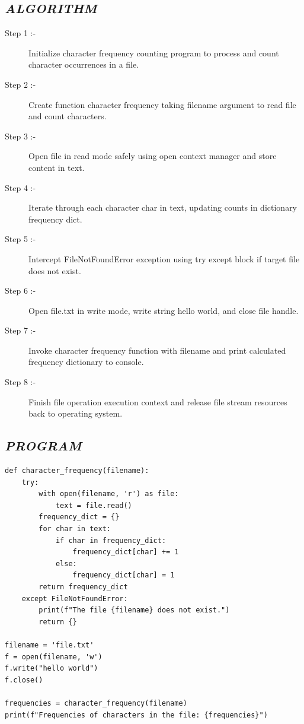 \documentclass[11pt,a4paper]{article}
\begin{document}
\subsection*{\textit{ALGORITHM}}
\begin{description}
  \item[Step 1 :-] Initialize character frequency counting program to process and count character occurrences in a file.
  \item[Step 2 :-] Create function character frequency taking filename argument to read file and count characters.
  \item[Step 3 :-] Open file in read mode safely using open context manager and store content in text.
  \item[Step 4 :-] Iterate through each character char in text, updating counts in dictionary frequency dict.
  \item[Step 5 :-] Intercept FileNotFoundError exception using try except block if target file does not exist.
  \item[Step 6 :-] Open file.txt in write mode, write string hello world, and close file handle.
  \item[Step 7 :-] Invoke character frequency function with filename and print calculated frequency dictionary to console.
  \item[Step 8 :-] Finish file operation execution context and release file stream resources back to operating system.
\end{description}

\subsection*{\textit{PROGRAM}}
\begin{lstlisting}[style=pythonstyle]
def character_frequency(filename): 
    try: 
        with open(filename, 'r') as file: 
            text = file.read() 
        frequency_dict = {} 
        for char in text: 
            if char in frequency_dict: 
                frequency_dict[char] += 1 
            else: 
                frequency_dict[char] = 1 
        return frequency_dict 
    except FileNotFoundError: 
        print(f"The file {filename} does not exist.") 
        return {} 

filename = 'file.txt' 
f = open(filename, 'w') 
f.write("hello world") 
f.close() 

frequencies = character_frequency(filename) 
print(f"Frequencies of characters in the file: {frequencies}")
\end{lstlisting}
\end{document}

